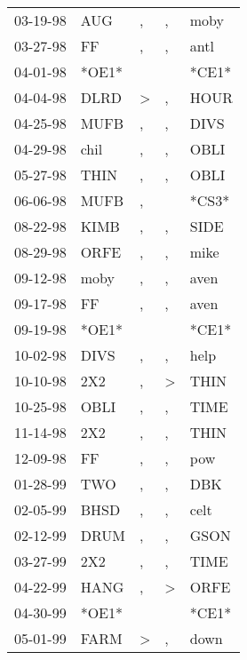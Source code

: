 \begin{supertabular}{lllll}
 03-19-98 &    AUG &             , &             , &   moby \\
 03-27-98 &     FF &             , &             , &   antl \\
 04-01-98 &  *OE1* &               &               &  *CE1* \\
 04-04-98 &   DLRD &  \textgreater &             , &   HOUR \\
 04-25-98 &   MUFB &             , &             , &   DIVS \\
 04-29-98 &   chil &             , &             , &   OBLI \\
 05-27-98 &   THIN &             , &             , &   OBLI \\
 06-06-98 &   MUFB &             , &               &  *CS3* \\
 08-22-98 &   KIMB &             , &             , &   SIDE \\
 08-29-98 &   ORFE &             , &             , &   mike \\
 09-12-98 &   moby &             , &             , &   aven \\
 09-17-98 &     FF &             , &             , &   aven \\
 09-19-98 &  *OE1* &               &               &  *CE1* \\
 10-02-98 &   DIVS &             , &             , &   help \\
 10-10-98 &    2X2 &             , &  \textgreater &   THIN \\
 10-25-98 &   OBLI &             , &             , &   TIME \\
 11-14-98 &    2X2 &             , &             , &   THIN \\
 12-09-98 &     FF &             , &             , &    pow \\
 01-28-99 &    TWO &             , &             , &    DBK \\
 02-05-99 &   BHSD &             , &             , &   celt \\
 02-12-99 &   DRUM &             , &             , &   GSON \\
 03-27-99 &    2X2 &             , &             , &   TIME \\
 04-22-99 &   HANG &             , &  \textgreater &   ORFE \\
 04-30-99 &  *OE1* &               &               &  *CE1* \\
 05-01-99 &   FARM &  \textgreater &             , &   down \\

\end{supertabular}
